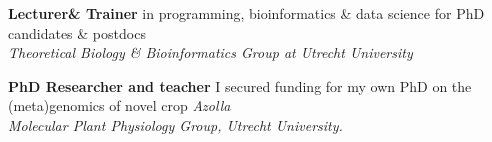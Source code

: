 \documentclass[a4paper,10pt]{article}
\begin{document}
{\begin{adjustbox}{valign=t}
\begin{minipage}[t]{0.3\textwidth}

\end{minipage}%
\end{adjustbox}%
\hfill%


\begin{adjustbox}{valign=t}
\hfill%
\begin{minipage}[t]{0.05\textwidth}
\MyVerticalRule
\end{minipage}%
\end{adjustbox}

\begin{adjustbox}{valign=t}
\hfill%
\begin{minipage}[t]{0.6\textwidth}


\begin{description}
\raggedright
\item[\normalfont \textcolor{ForestGreen}{\textbf{2022 -- now.}}] \textbf{Lecturer\&  Trainer} in programming, bioinformatics \& data science for PhD candidates \& postdocs \\
\textit{Theoretical Biology \& Bioinformatics Group at Utrecht University}
\item[\normalfont \textcolor{ForestGreen}{\textbf{2017 -- 2022.}}] \textbf{PhD Researcher and teacher} I secured funding for my own PhD on the (meta)genomics of novel crop \textit{Azolla} \\ 
\textit{Molecular Plant Physiology Group, Utrecht University.}
\end{description}


\end{minipage}
\end{adjustbox}}
\end{document}
